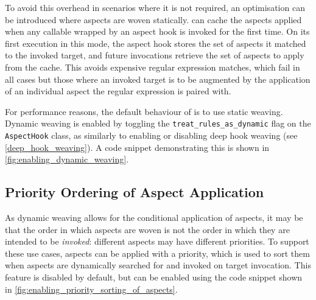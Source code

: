 To avoid this overhead in scenarios where it is not required, an optimisation
can be introduced where aspects are woven statically. \pdsfthree can cache the
aspects applied when any callable wrapped by an aspect hook is invoked for the
first time. On its first execution in this mode, the aspect hook stores the set
of aspects it matched to the invoked target, and future invocations retrieve the
set of aspects to apply from the cache. This avoids expensive regular expression
matches,
which fail in all cases but those where an invoked target is to be augmented by
the application of an individual aspect the regular expression is paired
with.

For performance reasons, the default behaviour of \pdsfthree is to use static
weaving. Dynamic weaving is enabled by toggling the
\lstinline{treat_rules_as_dynamic} flag on the \lstinline{AspectHook} class, as
similarly to enabling or disabling deep hook weaving (see
\cref{deep_hook_weaving}). A code snippet demonstrating this is shown in
\cref{fig:enabling_dynamic_weaving}.


\subsection{Priority Ordering of Aspect Application}
\label{aspect_priority_support}

As dynamic weaving allows for the conditional application of aspects, it may be
that the order in which aspects are woven is not the order in which they are
intended to be \emph{invoked}: different aspects may have different priorities.
To support these use cases, aspects can be applied with a priority, which is
used to sort them when aspects are dynamically searched for and invoked on
target invocation. This feature is disabled by default, but can be enabled using
the code snippet shown in \cref{fig:enabling_priority_sorting_of_aspects}.

